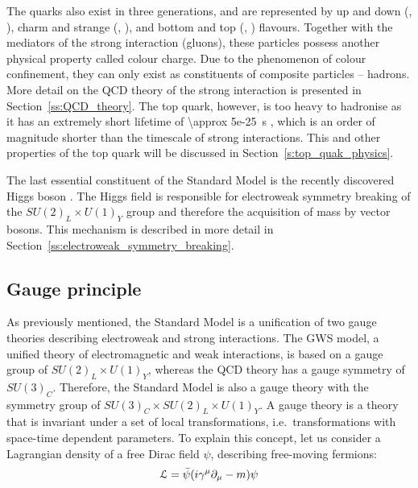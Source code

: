 The quarks also exist in three generations, and are represented by up and down (\cPqu, \cPqd), charm and strange (\cPqc,
\cPqs), and bottom and top (\cPqb, \cPqt) flavours. Together with the mediators of the strong interaction (gluons),
these particles possess another physical property called colour charge. Due to the phenomenon of colour confinement,
they can only exist as constituents of composite particles -- hadrons. More detail on the QCD theory of the strong
interaction is presented in Section~\ref{ss:QCD_theory}. The top quark, however, is too heavy to hadronise as it has an
extremely short lifetime of \SI{\approx 5e-25}{\s} \autocite{PDG}, which is an order of magnitude shorter than the
timescale of strong interactions. This and other properties of the top quark will be discussed in
Section~\ref{s:top_quak_physics}.

The last essential constituent of the Standard Model is the recently discovered Higgs boson
\autocite{ATLAS_higgs_observation, CMS_higgs_observation}. The Higgs field is responsible for electroweak symmetry
breaking of the $SU(2)_L \times U(1)_Y$ group and therefore the acquisition of mass by vector bosons. This mechanism is
described in more detail in Section~\ref{ss:electroweak_symmetry_breaking}.

\vspace{1cm}



\newpage
\subsection{Gauge principle}
\label{ss:gauge_principle}
As previously mentioned, the Standard Model is a unification of two gauge theories describing electroweak and strong
interactions. The GWS model, a unified theory of electromagnetic and weak interactions, is based on a gauge group of
$SU(2)_L \times U(1)_Y$, whereas the QCD theory has a gauge symmetry of $SU(3)_C$. Therefore, the Standard Model is also
a gauge theory with the symmetry group of $SU(3)_C \times SU(2)_L \times U(1)_Y$. A gauge theory is a theory that is
invariant under a set of local transformations, i.e.\ transformations with space-time dependent parameters. To explain
this concept, let us consider a Lagrangian density of a free Dirac field $\psi$, describing free-moving fermions:
\begin{equation}
\mathcal{L} = \bar{\psi}(i \gamma^\mu	\partial_\mu - m) \psi
\label{eq:dirac_field_L}
\end{equation}


